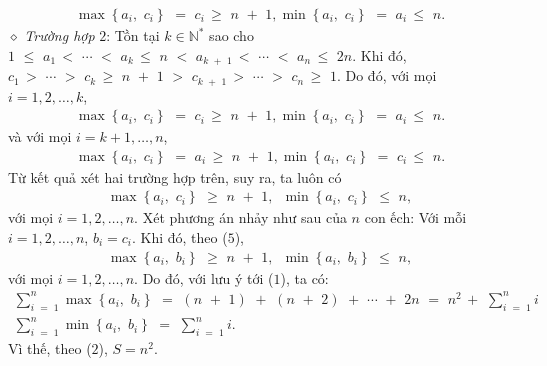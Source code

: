 \begin{multicols}{2}
	\begin{align*}
		\max \left\{ {{a_i},\,\,{c_i}} \right\}\,\, = \,\,{c_i}\, \ge \,\,n\,\, + \,\,1, \min \left\{ {{a_i},\,\,{c_i}} \right\}\,\, = \,\,{a_i}\, \le \,\,n.
	\end{align*}
	$\diamond$ \textit{Trường hợp} $2$: Tồn tại $k \in \mathbb{N^*}$  sao cho  $1\,\, \le \,\,{a_1}\, < \,\, \cdots \,\, < \,\,{a_k}\, \le \,\,n\,\, < \,\,{a_{k\,\, + \,\,1}}\, < \,\, \cdots \,\, < \,\,{a_n}\, \le \,\,2n.$ 
	\vskip 0.05cm
	Khi đó, ${c_1}\, > \,\, \cdots \,\, > \,\,{c_k}\, \ge \,\,n\,\, + \,\,1\,\, > \,\,{c_{k\,\, + \,\,1}}\, > \,\, \cdots \,\, > \,\,{c_n}\, \ge \,\,1.$ 
	\vskip 0.05cm
	Do đó, với mọi $i = 1, 2, …, k$,
	\begin{align*}
		\max \left\{ {{a_i},\,\,{c_i}} \right\}\,\, = \,\,{c_i}\, \ge \,\,n\,\, + \,\,1, \min \left\{ {{a_i},\,\,{c_i}} \right\}\,\, = \,\,{a_i}\, \le \,\,n.
	\end{align*}
	và với mọi $i = k + 1, …, n$,
	\begin{align*}
		\max \left\{ {{a_i},\,\,{c_i}} \right\}\,\, = \,\,{a_i}\, \ge \,\,n\,\, + \,\,1, \min \left\{ {{a_i},\,\,{c_i}} \right\}\,\, = \,\,{c_i}\, \le \,\,n.
	\end{align*}
	Từ kết quả xét hai trường hợp trên, suy ra, ta luôn có
	\begin{align*}
		\max \left\{ {{a_i},\,\,{c_i}} \right\}\,\, \ge \,\,n\,\, + \,\,1,\,\,\,\min \left\{ {{a_i},\,\,{c_i}} \right\}\,\, \le \,\,n, \tag{$5$}
	\end{align*}
	với mọi $i = 1, 2, \ldots, n$.
	\vskip 0.05cm
	Xét phương án nhảy như sau của $n$ con ếch: Với mỗi $i = 1, 2, \ldots, n$, $b_i = c_i$.
	\vskip 0.05cm  
	Khi đó, theo ($5$),
	\begin{align*}
		\max \left\{ {{a_i},\,\,{b_i}} \right\}\,\, \ge \,\,n\,\, + \,\,1,\,\,\,\min \left\{ {{a_i},\,\,{b_i}} \right\}\,\, \le \,\,n,
	\end{align*}
	với mọi $i = 1, 2, …, n$.
	\vskip 0.05cm
	Do đó, với lưu ý tới ($1$), ta có:
	\begin{align*}
		\sum\limits_{i\,\, = \,\,1}^n {\max \left\{ {{a_i},\,\,{b_i}} \right\}} \,\, = \,\,\left( {n\,\, + \,\,1} \right)\,\, + \,\,\left( {n\,\, + \,\,2} \right)\,\, + \,\, \cdots \,\, + \,\,2n\,\, = \,\,{n^2}\, + \,\,\sum\limits_{i\,\, = \,\,1}^n i\\
		\sum\limits_{i\,\, = \,\,1}^n {\min \left\{ {{a_i},\,\,{b_i}} \right\}} \,\, = \,\,\sum\limits_{i\,\, = \,\,1}^n i.
	\end{align*}
	Vì thế, theo ($2$), $S = n^2$.
	\vskip 0.05cm  

\end{multicols}
